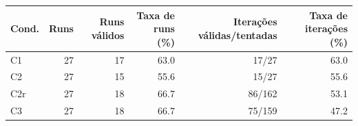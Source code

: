 \begin{tabular}{lrrrrr}
\toprule
Cond. & Runs & Runs v\'alidos & Taxa de runs (\%) & Itera\c{c}\~oes v\'alidas/tentadas & Taxa de itera\c{c}\~oes (\%) \\
\midrule
C1 & 27 & 17 & 63.0 & 17/27 & 63.0 \\
C2 & 27 & 15 & 55.6 & 15/27 & 55.6 \\
C2r & 27 & 18 & 66.7 & 86/162 & 53.1 \\
C3 & 27 & 18 & 66.7 & 75/159 & 47.2 \\
\bottomrule
\end{tabular}
